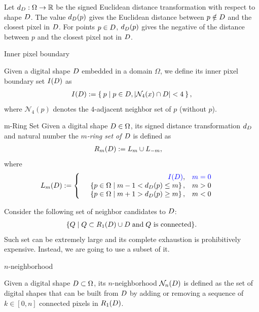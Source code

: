 Let $d_{D}:\Omega \rightarrow \mathbb{R}$ be the signed Euclidean distance transformation with respect to shape $D$. The value $d_{D}(p)$ gives the Euclidean distance between $p \notin D$ and the closest pixel in $D$. For points $p \in D$, $d_{D}(p)$ gives the negative of the distance between $p$ and the closest pixel not in $D$.
\begin{definition}{Inner pixel boundary}

Given a digital shape $D$ embedded in a domain $\Omega$, we define its inner pixel boundary set $I(D)$ as
\begin{align*}
	I(D) := \left\{ \: p \; | \; p \in D, |\mathcal{N}_4(x) \cap D|<4 \: \right\},
\end{align*}
where $\mathcal{N}_4(p)$ denotes the $4$-adjacent neighbor set of $p$ (without $p$). 
\end{definition}
\begin{definition}{m-Ring Set}
Given a digital shape $D \in\Omega$, its signed distance transformation $d_{D}$ and natural number  %
the {\em $m$-ring set of $D$} is defined as
\begin{align*}
	R_m(D) &:= L_m \cup L_{-m},
\end{align*}
where
\begin{align*}
	L_m(D) &:= \left\{ \quad \begin{array}{rc}
		{\color{blue}{I(D)}}, & {\color{blue}{m=0}}\\
		\left\{ p \in \Omega \; | \; m-1 < d_{D}(p) \leq m \right\}, &  m>0\\
		\left\{ p \in \Omega \; | \; m+1 > d_{D}(p) \geq m \right\}, &  m<0
		\end{array} \right.
\end{align*}
\end{definition}
 Consider the following set of neighbor candidates to $D$:
\begin{align*}
\{ Q \; | \; Q \subset R_1(D) \cup D \; \text{and} \; \text{$Q$ is connected} \}.
\end{align*}
Such set can be extremely large and its complete exhaustion is prohibitively expensive.  Instead, we are going to use a subset of it.
\begin{definition}{$n$-neighborhood}

	Given a digital shape $D \subset \Omega$, its $n$-neigh\-bor\-hood $\mathcal{N}_n(D)$ is defined as the set of digital shapes that can be built from $D$ by adding or removing a sequence of $k \in [0,n]$ connected pixels in $R_1(D)$.

\end{definition}


